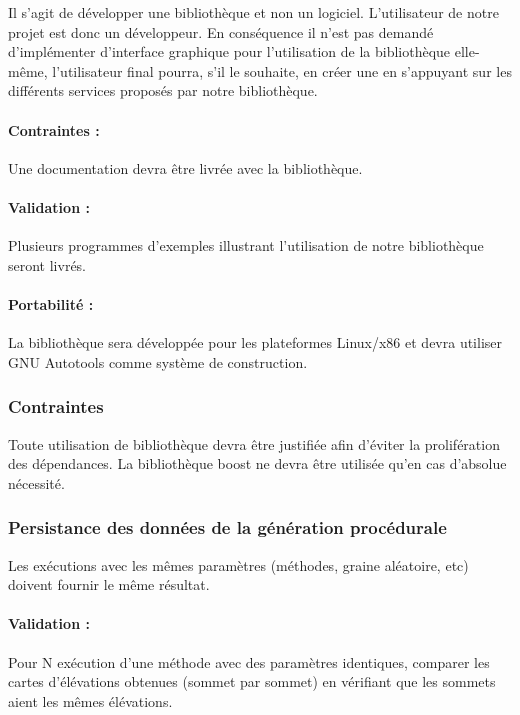 Il s'agit de développer une bibliothèque et non un logiciel. L'utilisateur
de notre projet est donc un développeur. En conséquence il n'est pas demandé
d'implémenter d'interface graphique pour l'utilisation de la bibliothèque elle-m\^eme, l'utilisateur final pourra, s'il le souhaite, en créer une en s'appuyant sur les différents services proposés par notre bibliothèque.\\

\paragraph{Contraintes :}
Une documentation devra être livrée avec la bibliothèque.

\paragraph{Validation :}
Plusieurs programmes d'exemples illustrant l'utilisation de notre bibliothèque seront livrés.

\paragraph{Portabilité :}
La bibliothèque sera développée pour les plateformes Linux/x86 et devra utiliser
GNU Autotools comme système de construction.

\subsubsection{Contraintes}
Toute utilisation de bibliothèque devra \^etre justifiée afin d'éviter la prolifération des dépendances. La bibliothèque boost ne devra \^etre utilisée qu'en cas d'absolue nécessité.

\subsubsection{Persistance des données de la génération procédurale}
Les exécutions avec les mêmes paramètres (méthodes, graine aléatoire, etc)
doivent fournir le même résultat.

\paragraph{Validation :}
Pour N exécution d'une méthode avec des paramètres identiques, comparer les cartes d'élévations obtenues (sommet par sommet) en vérifiant que les sommets aient les mêmes élévations. 

